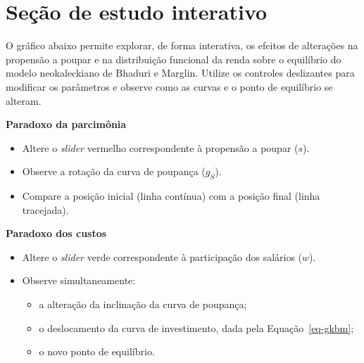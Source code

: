 \documentclass[
  brazilian,
  letterpaper,
  DIV=11,
  numbers=noendperiod]{scrreprt}
\providecommand{\tightlist}{%
  \setlength{\itemsep}{0pt}\setlength{\parskip}{0pt}}
\begin{document}
\section{Seção de estudo interativo}\label{sec-estudo}

O gráfico abaixo permite explorar, de forma interativa, os efeitos de
alterações na propensão a poupar e na distribuição funcional da renda
sobre o equilíbrio do modelo neokaleckiano de Bhaduri e Marglin. Utilize
os controles deslizantes para modificar os parâmetros e observe como as
curvas e o ponto de equilíbrio se alteram.

\begin{tcolorbox}[enhanced jigsaw, arc=.35mm, bottomrule=.15mm, bottomtitle=1mm, breakable, colback=white, colbacktitle=quarto-callout-tip-color!10!white, colframe=quarto-callout-tip-color-frame, coltitle=black, left=2mm, leftrule=.75mm, opacityback=0, opacitybacktitle=0.6, rightrule=.15mm, title=\textcolor{quarto-callout-tip-color}{\faLightbulb}\hspace{0.5em}{Como utilizar o simulador}, titlerule=0mm, toprule=.15mm, toptitle=1mm]

\textbf{Paradoxo da parcimônia}

\begin{itemize}
\tightlist
\item
  Altere o \emph{slider} vermelho correspondente à propensão a poupar
  (\(s\)).
\item
  Observe a rotação da curva de poupança (\(g_S\)).
\item
  Compare a posição inicial (linha contínua) com a posição final (linha
  tracejada).
\end{itemize}

\textbf{Paradoxo dos custos}

\begin{itemize}
\tightlist
\item
  Altere o \emph{slider} verde correspondente à participação dos
  salários (\(w\)).
\item
  Observe simultaneamente:

  \begin{itemize}
  \tightlist
  \item
    a alteração da inclinação da curva de poupança;
  \item
    o deslocamento da curva de investimento, dada pela
    Equação~\ref{eq-gkbm};
  \item
    o novo ponto de equilíbrio.
  \end{itemize}
\end{itemize}

\end{tcolorbox}
\end{document}
